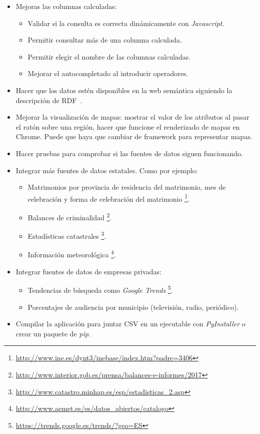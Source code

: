 \begin{itemize}
	\item Mejoras las columnas calculadas:
	\begin{itemize}
		\item Validar si la consulta es correcta dinámicamente con \textit{Javascript}.
		\item Permitir consultar más de una columna calculada.
		\item Permitir elegir el nombre de las columnas calculadas.
		\item Mejorar el autocompletado al introducir operadores.
	\end{itemize}
	\item Hacer que los datos estén disponibles en la web semántica siguiendo la descripción de RDF~\cite{misc:informationserviceengineering}.
	\item Mejorar la visualización de mapas: mostrar el valor de los atributos al pasar el ratón sobre una región, hacer que funcione el renderizado de mapas en Chrome. Puede que haya que cambiar de framework para representar mapas. 
	\item Hacer pruebas para comprobar si las fuentes de datos siguen funcionando.
	\item Integrar más fuentes de datos estatales. Como por ejemplo:
	\begin{itemize}
		\item Matrimonios por provincia de residencia del matrimonio, mes de celebración y forma de celebración del matrimonio
		\footnote{\href{http://www.ine.es/dynt3/inebase/index.htm?padre=3406}{http://www.ine.es/dynt3/inebase/index.htm?padre=3406}}.
		\item Balances de criminalidad
		\footnote{\href{http://www.interior.gob.es/prensa/balances-e-informes/2017}{http://www.interior.gob.es/prensa/balances-e-informes/2017}}.
		\item Estadísticas catastrales
		\footnote{\href{http://www.catastro.minhap.es/esp/estadisticas\_2.asp}{http://www.catastro.minhap.es/esp/estadisticas\_2.asp}}.
		\item Información meteorológica
		\footnote{\href{http://www.aemet.es/es/datos\_abiertos/catalogo}{http://www.aemet.es/es/datos\_abiertos/catalogo}}.
	\end{itemize}
	\item Integrar fuentes de datos de empresas privadas:
	\begin{itemize}
		\item Tendencias de búsqueda como \textit{Google Trends}
		\footnote{\href{https://trends.google.es/trends/?geo=ES}{https://trends.google.es/trends/?geo=ES}}.
		\item Porcentajes de audiencia por municipio (televisión, radio, periódico).
	\end{itemize}
	\item Compilar la aplicación para juntar CSV en un ejecutable con \textit{PyInstaller} o crear un paquete de \textit{pip}. 
\end{itemize}